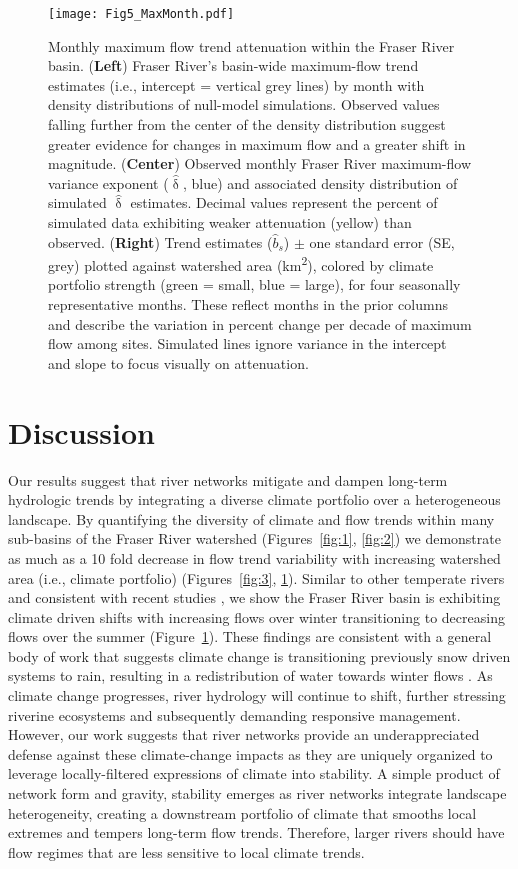 \documentclass[draft,linenumbers]{AGUJournal}
\begin{document}
\begin{figure}[h]
\centering
\texttt{[image: Fig5\_MaxMonth.pdf]}
	\caption{Monthly maximum flow trend attenuation within the Fraser River basin. (\textbf{Left}) Fraser River's basin-wide maximum-flow trend estimates (i.e., intercept = vertical grey lines) by month with density distributions of null-model simulations. Observed values falling further from the center of the density distribution suggest greater evidence for changes in maximum flow and a greater shift in magnitude. (\textbf{Center}) Observed monthly Fraser River maximum-flow variance exponent ($\hat{\updelta}$, blue) and associated density distribution of simulated $\hat{\updelta}$ estimates. Decimal values represent the percent of simulated data exhibiting weaker attenuation (yellow) than observed. (\textbf{Right}) Trend estimates ($\hat{b}_{s}$) $\pm$ one standard error (SE, grey) plotted against watershed area (km\textsuperscript{2}), colored by climate portfolio strength (green = small, blue = large), for four seasonally representative months. These reflect months in the prior columns and describe the variation in percent change per decade of maximum flow among sites. Simulated lines ignore variance in the intercept and slope to focus visually on attenuation.}
\label{fig:4}
\end{figure}

\section{Discussion}

Our results suggest that river networks mitigate and dampen long-term hydrologic trends by integrating a diverse climate portfolio over a heterogeneous landscape. By quantifying the diversity of climate and flow trends within many sub-basins of the Fraser River watershed (Figures~\ref{fig:1}, \ref{fig:2}) we demonstrate as much as a 10 fold decrease in flow trend variability with increasing watershed area (i.e., climate portfolio) (Figures~\ref{fig:3}, \ref{fig:4}). Similar to other temperate rivers \citep{Rauscher:2008} and consistent with recent studies \citep [e.g.,][]{Kang:2016, Kang:2014, Shrestha:2012}, we show the Fraser River basin is exhibiting climate driven shifts with increasing flows over winter transitioning to decreasing flows over the summer (Figure~\ref{fig:4}). These findings are consistent with a general body of work that suggests climate change is transitioning previously snow driven systems to rain, resulting in a redistribution of water towards winter flows \citep{Bindoff:2013}. As climate change progresses, river hydrology will continue to shift, further stressing riverine ecosystems and subsequently demanding responsive management. However, our work suggests that river networks provide an underappreciated defense against these climate-change impacts as they are uniquely organized to leverage locally-filtered expressions of climate into stability. A simple product of network form and gravity, stability emerges as river networks integrate landscape heterogeneity, creating a downstream portfolio of climate that smooths local extremes and tempers long-term flow trends. Therefore, larger rivers should have flow regimes that are less sensitive to local climate trends.
\end{document}

